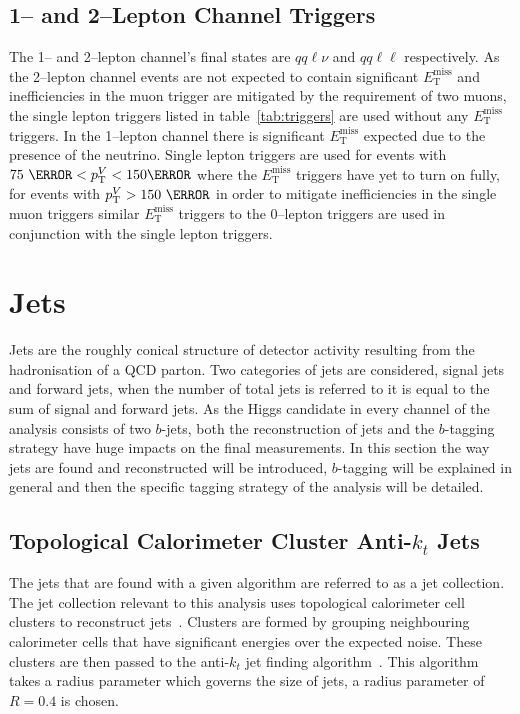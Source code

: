\subsection{1-- and 2--Lepton Channel Triggers}
The 1-- and 2--lepton channel's final states are $qq\ell\nu$ and $qq\ell\ell$
respectively. As the 2--lepton channel events are not expected to contain
significant $E_{\mathrm{T}}^{\text{miss}}$ and inefficiencies in the muon trigger are
mitigated by the requirement of two muons, the single lepton triggers listed in
table~\ref{tab:triggers} are used without any $E_{\mathrm{T}}^{\text{miss}}$
triggers. In the 1--lepton channel there is significant $E_{\mathrm{T}}^{\text{miss}}$
expected due to the presence of the neutrino. Single lepton triggers are used
for events with $75~\GeV < p_{\mathrm{T}}^{V} < 150 \GeV$ where the $E_{\mathrm{T}}^{\text{miss}}$
triggers have yet to turn on fully, for events with $p_{\mathrm{T}}^{V} > 150~\GeV$ in
order to mitigate inefficiencies in the single muon triggers similar
$E_{\mathrm{T}}^{\text{miss}}$ triggers to the 0--lepton triggers are used in conjunction
with the single lepton triggers.

\section{Jets}
\label{sec:jets}

Jets are the roughly conical structure of detector activity resulting from the
hadronisation of a QCD parton. Two categories of jets are considered, signal
jets and forward jets, when the number of total jets is referred to it is equal
to the sum of signal and forward jets. As the Higgs candidate in every channel
of the analysis consists of two $b$-jets, both the reconstruction of jets and
the $b$-tagging strategy have huge impacts on the final measurements. In this
section the way jets are found and reconstructed will be introduced, $b$-tagging
will be explained in general and then the specific tagging strategy of the
analysis will be detailed.

\subsection{Topological Calorimeter Cluster Anti-$k_t$ Jets}
The jets that are found with a given algorithm are referred to as a jet
collection. The jet collection relevant to this analysis uses topological
calorimeter cell clusters to reconstruct jets~\cite{CALO2008}. Clusters are
formed by grouping neighbouring calorimeter cells that have significant energies
over the expected noise. These clusters are then passed to the anti-$k_t$ jet
finding algorithm~\cite{anti-kt}. This algorithm takes a radius parameter which
governs the size of jets, a radius parameter of $R=0.4$ is chosen.

